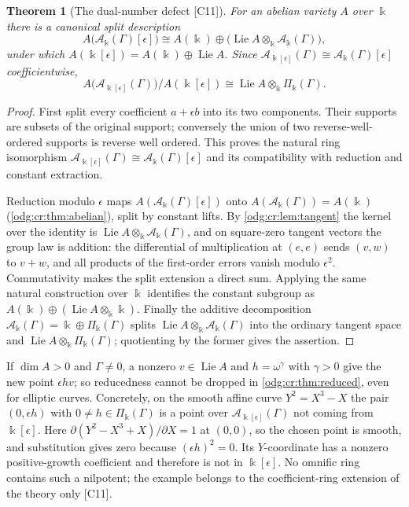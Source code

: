 \documentclass[11pt,oneside]{article}
\numberwithin{equation}{section}
\newtheorem{theorem}{Theorem}[section]
\theoremstyle{definition}
\theoremstyle{remark}
\newcommand{\src}[1]{\textup{\textsf{\small[#1]}}}
\newcommand{\crA}{\mathcal A_\Bbbk(\Gamma)}
\newcommand{\crP}{\Pi_\Bbbk(\Gamma)}
\newcommand{\Lie}{\operatorname{Lie}}
\begin{document}
\begin{theorem}[The dual-number defect \src{C11}]\label{odg:cr:thm:dualdefect}
For an abelian variety $A$ over $\Bbbk$ there is a canonical split description
\[
 A\bigl(\crA[\epsilon]\bigr)\cong A(\Bbbk)\oplus\bigl(\Lie A\otimes_\Bbbk\crA\bigr),
\]
under which $A(\Bbbk[\epsilon])=A(\Bbbk)\oplus\Lie A$. Since
$\mathcal A_{\Bbbk[\epsilon]}(\Gamma)\cong\crA[\epsilon]$ coefficientwise,
\[
 A\bigl(\mathcal A_{\Bbbk[\epsilon]}(\Gamma)\bigr)\big/A(\Bbbk[\epsilon])
 \cong\Lie A\otimes_\Bbbk\crP .
\]
\end{theorem}
\begin{proof}
First split every coefficient $a+\epsilon b$ into its two components.
Their supports are subsets of the original support; conversely the union
of two reverse-well-ordered supports is reverse well ordered.
This proves the natural ring isomorphism
$\mathcal A_{\Bbbk[\epsilon]}(\Gamma)\cong\crA[\epsilon]$ and its
compatibility with reduction and constant extraction.

Reduction modulo $\epsilon$ maps $A(\crA[\epsilon])$ onto $A(\crA)=A(\Bbbk)$
(\cref{odg:cr:thm:abelian}), split by constant lifts. By \cref{odg:cr:lem:tangent} the
kernel over the identity is $\Lie A\otimes_\Bbbk\crA$, and on square-zero tangent vectors
the group law is addition: the differential of multiplication at $(e,e)$
sends $(v,w)$ to $v+w$, and all products of the first-order errors vanish
modulo $\epsilon^2$. Commutativity makes the split extension a direct sum.
Applying the same natural construction over $\Bbbk$ identifies the
constant subgroup as $A(\Bbbk)\oplus(\Lie A\otimes_\Bbbk\Bbbk)$.
Finally the additive decomposition $\crA=\Bbbk\oplus\crP$ splits
$\Lie A\otimes_\Bbbk\crA$ into the ordinary tangent space and
$\Lie A\otimes_\Bbbk\crP$; quotienting by the former gives the assertion.
\end{proof}

If $\dim A>0$ and $\Gamma\ne0$, a nonzero $v\in\Lie A$ and $h=\omega^\gamma$ with
$\gamma>0$ give the new point $\epsilon hv$; so reducedness cannot be dropped in
\cref{odg:cr:thm:reduced}, even for elliptic curves. Concretely, on the smooth affine
curve $Y^2=X^3-X$ the pair $(0,\epsilon h)$ with $0\ne h\in\crP$ is a point over
$\mathcal A_{\Bbbk[\epsilon]}(\Gamma)$ not coming from $\Bbbk[\epsilon]$.
Here $\partial(Y^2-X^3+X)/\partial X=1$ at $(0,0)$, so the chosen point
is smooth, and substitution gives zero because $(\epsilon h)^2=0$.
Its $Y$-coordinate has a nonzero positive-growth coefficient and therefore
is not in $\Bbbk[\epsilon]$. No omnific ring
contains such a nilpotent; the example belongs to the coefficient-ring extension of
the theory only \src{C11}.
\end{document}
